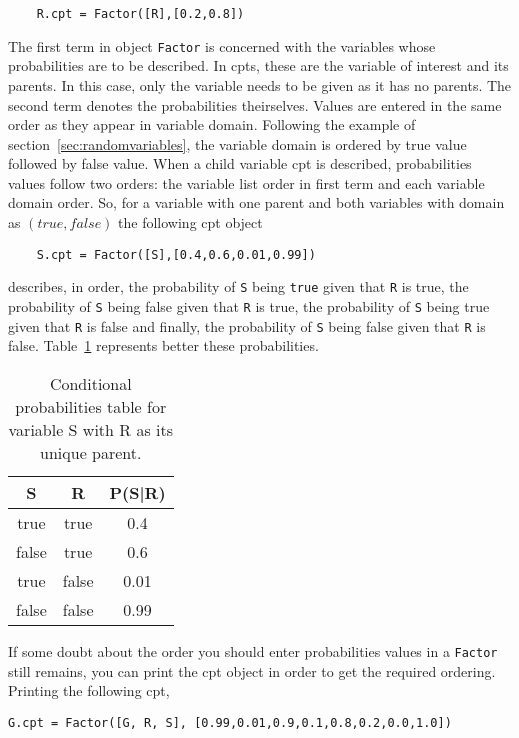 \documentclass[10pt,a4paper]{report}
\begin{document}
\begin{verbatim}
	R.cpt = Factor([R],[0.2,0.8])
\end{verbatim}

The first term in object \verb|Factor| is concerned with the variables whose probabilities are to be described. In cpts, these are the variable of interest and its parents. In this case, only the variable needs to be given as it has no parents. The second term denotes the probabilities theirselves. Values are entered in the same order as they appear in variable domain. Following the example of section~\ref{sec:randomvariables}, the variable domain is ordered by true value followed by false value.
When a child variable cpt is described, probabilities values follow two orders: the variable list order in first term and each variable domain order. So, for a variable with one parent and both variables with domain as $(true,false)$ the following cpt object
\begin{verbatim}
	S.cpt = Factor([S],[0.4,0.6,0.01,0.99])
\end{verbatim}
describes, in order, the probability of \verb|S| being \verb|true| given that \verb|R| is true, the probability of \verb|S| being false given that \verb|R| is true, the probability of \verb|S| being true given that \verb|R| is false and finally, the probability of \verb|S| being false given that \verb|R| is false. Table~\ref{tab:twovariablescpt} represents better these probabilities.

\begin{table}
\centering
\begin{tabular}{|c|c|c|}
\hline S & R & P(S|R) \\ 
\hline true & true & 0.4 \\ 
\hline false & true & 0.6 \\ 
\hline true & false & 0.01 \\ 
\hline false & false & 0.99 \\ 
\hline 
\end{tabular} 
\label{tab:twovariablescpt}
\caption{Conditional probabilities table for variable S with R as its unique parent.}
\end{table}

If some doubt about the order you should enter probabilities values in a \verb|Factor| still remains, you can print the cpt object in order to get the required ordering. Printing the following cpt,

\begin{verbatim}
G.cpt = Factor([G, R, S], [0.99,0.01,0.9,0.1,0.8,0.2,0.0,1.0])
\end{verbatim}
\end{document}
